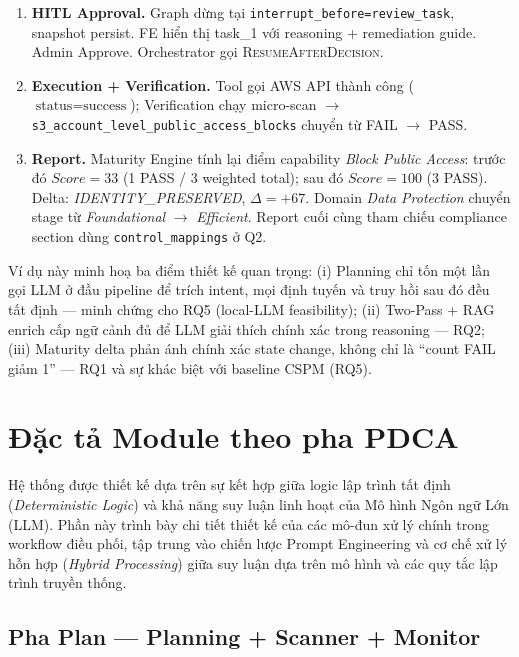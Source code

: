 \begin{enumerate}
  \item \textbf{HITL Approval.} Graph dừng tại \texttt{interrupt\_before=review\_task}, snapshot persist. FE hiển thị task\_1 với reasoning + remediation guide. Admin Approve. Orchestrator gọi \textsc{ResumeAfterDecision}.

  \item \textbf{Execution + Verification.} Tool gọi AWS API thành công ($\text{status}=\text{success}$); Verification chạy micro-scan $\to$ \texttt{s3\_account\_level\_public\_access\_blocks} chuyển từ FAIL $\to$ PASS.

  \item \textbf{Report.} Maturity Engine tính lại điểm capability \textit{Block Public Access}: trước đó $Score=33$ (1 PASS / 3 weighted total); sau đó $Score=100$ (3 PASS). Delta: \textit{IDENTITY\_PRESERVED}, $\Delta = +67$. Domain \textit{Data Protection} chuyển stage từ \textit{Foundational} $\to$ \textit{Efficient}. Report cuối cùng tham chiếu compliance section dùng \texttt{control\_mappings} ở Q2.
\end{enumerate}

Ví dụ này minh hoạ ba điểm thiết kế quan trọng: (i) Planning chỉ tốn một lần gọi LLM ở đầu pipeline để trích intent, mọi định tuyến và truy hồi sau đó đều tất định --- minh chứng cho RQ5 (local-LLM feasibility); (ii) Two-Pass + RAG enrich cấp ngữ cảnh đủ để LLM giải thích chính xác trong reasoning --- RQ2; (iii) Maturity delta phản ánh chính xác state change, không chỉ là ``count FAIL giảm 1'' --- RQ1 và sự khác biệt với baseline CSPM (RQ5).


\section{Đặc tả Module theo pha PDCA}
\label{sec:module_specs}

Hệ thống được thiết kế dựa trên sự kết hợp
giữa logic lập trình tất định
(\textit{Deterministic Logic})
và khả năng suy luận linh hoạt
của Mô hình Ngôn ngữ Lớn (LLM).
Phần này trình bày chi tiết
thiết kế của các mô-đun xử lý chính
trong workflow điều phối,
tập trung vào chiến lược Prompt Engineering
và cơ chế xử lý hỗn hợp
(\textit{Hybrid Processing})
giữa suy luận dựa trên mô hình
và các quy tắc lập trình truyền thống.

\subsection{Pha Plan --- Planning + Scanner + Monitor}
\label{sec:phase_plan}

